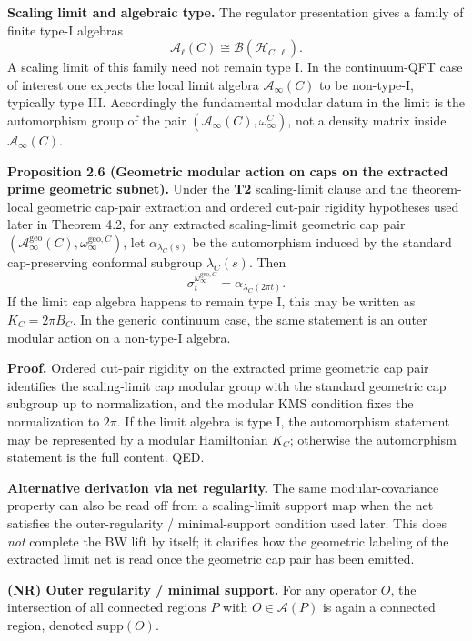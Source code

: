 \textbf{Scaling limit and algebraic type.} The regulator presentation gives a family of finite type-I algebras
\[
\mathcal A_{\ell}(C)\cong \mathcal B(\mathcal H_{C,\ell}).
\]
A scaling limit of this family need not remain type I. In the continuum-QFT case of interest one expects the local limit algebra \(\mathcal A_\infty(C)\) to be non-type-I, typically type III. Accordingly the fundamental modular datum in the limit is the automorphism group of the pair \((\mathcal A_\infty(C),\omega_\infty^C)\), not a density matrix inside \(\mathcal A_\infty(C)\).

\textbf{Proposition 2.6 (Geometric modular action on caps on the extracted prime geometric subnet).} Under the \textbf{T2} scaling-limit clause and the theorem-local geometric cap-pair extraction and ordered cut-pair rigidity hypotheses used later in Theorem 4.2, for any extracted scaling-limit geometric cap pair \((\mathcal A_\infty^{\mathrm{geo}}(C),\omega_\infty^{\mathrm{geo},C})\), let \(\alpha_{\lambda_C(s)}\) be the automorphism induced by the standard cap-preserving conformal subgroup \(\lambda_C(s)\). Then
\[
\sigma_t^{\omega_\infty^{\mathrm{geo},C}}
=
\alpha_{\lambda_C(2\pi t)}.
\]
If the limit cap algebra happens to remain type I, this may be written as \(K_C=2\pi B_C\). In the generic continuum case, the same statement is an outer modular action on a non-type-I algebra.

\textbf{Proof.} Ordered cut-pair rigidity on the extracted prime geometric cap pair identifies the scaling-limit cap modular group with the standard geometric cap subgroup up to normalization, and the modular KMS condition fixes the normalization to \(2\pi\). If the limit algebra is type I, the automorphism statement may be represented by a modular Hamiltonian \(K_C\); otherwise the automorphism statement is the full content. QED.

\textbf{Alternative derivation via net regularity.} The same modular-covariance property can also be read off from a scaling-limit support map when the net satisfies the outer-regularity / minimal-support condition used later. This does \emph{not} complete the BW lift by itself; it clarifies how the geometric labeling of the extracted limit net is read once the geometric cap pair has been emitted.

\textbf{(NR) Outer regularity / minimal support.} For any operator \(O\), the intersection of all connected regions \(P\) with \(O\in\mathcal A(P)\) is again a connected region, denoted \(\mathrm{supp}(O)\).

